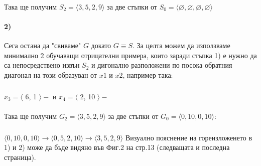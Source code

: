 \documentclass[12pt]{article}
\begin{document}
	\paragraph{}
	Така ще получим $S_{2} = \langle 3, 5, 2, 9 \rangle$ за две стъпки от $S_{0} = \langle \varnothing,\varnothing,\varnothing,\varnothing \rangle$
	
	\paragraph{2)}
	Сега остана да "свиваме" $G$ докато $G \equiv S$.\newline\newline
	За целта можем да използваме минимално 2 обучаващи отрицателни примера, които заради стъпка 1) е нужно да са непосредствено извън $S_{2}$ и дигонално разположени по посока обратния диагонал на този образуван от $x1$ и $x2$, например така:
		\subparagraph{}
		$x_{3} = \langle $ 6, 1 $\rangle  -$ и $x_{4} = \langle $ 2, 10 $\rangle  -$
		
	\paragraph{}
	Така ще получим $G_{2} = \langle 3, 5, 2, 9 \rangle$ за две стъпки от $G_{0} = \langle 0,10,0,10 \rangle$:
		\subparagraph{}
		$\langle 0,10,0,10\rangle \rightarrow \langle 0,5,2,10 \rangle \rightarrow \langle 3,5,2,9 \rangle$
	\newline\newline\newline
	Визуално пояснение на гореизложенето в 1) и 2) може да бъде видяно във Фиг.2 на стр.13 (следващата и последна страница).
\end{document}
